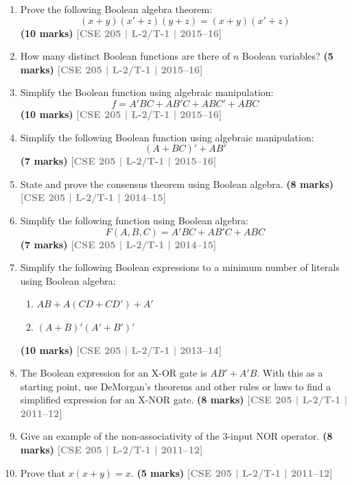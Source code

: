\documentclass[12pt]{article}
\newcommand{\yr}[1]{\hfill\textcolor{gray}{\small\textbf{[#1]}}}
\newcommand{\mk}[1]{\textcolor{orange!70!black}{\small\textbf{(#1 marks)}}}
\begin{document}
\begin{enumerate}
\item Prove the following Boolean algebra theorem:
\[ (x + y)(x' + z)(y + z) = (x + y)(x' + z) \]
\mk{10} \yr{CSE 205 | L-2/T-1 | 2015--16}



\item How many distinct Boolean functions are there of $n$ Boolean variables?
\mk{5} \yr{CSE 205 | L-2/T-1 | 2015--16}



\item Simplify the Boolean function using algebraic manipulation:
\[ f = A'BC + AB'C + ABC' + ABC \]
\mk{10} \yr{CSE 205 | L-2/T-1 | 2015--16}



\item Simplify the following Boolean function using algebraic manipulation:
\[ (A + BC)' + AB' \]
\mk{7} \yr{CSE 205 | L-2/T-1 | 2015--16}



\item State and prove the consensus theorem using Boolean algebra.
\mk{8} \yr{CSE 205 | L-2/T-1 | 2014--15}



\item Simplify the following function using Boolean algebra:
\[ F(A, B, C) = A'BC + AB'C + ABC \]
\mk{7} \yr{CSE 205 | L-2/T-1 | 2014--15}



\item Simplify the following Boolean expressions to a minimum number of literals using Boolean algebra:
\begin{enumerate}
  \item $AB + A(CD + CD') + A'$
  \item $(A + B)'(A' + B')'$
\end{enumerate}
\mk{10} \yr{CSE 205 | L-2/T-1 | 2013--14}



\item The Boolean expression for an X-OR gate is $AB' + A'B$. With this as a starting point, use DeMorgan's theorems and other rules or laws to find a simplified expression for an X-NOR gate.
\mk{8} \yr{CSE 205 | L-2/T-1 | 2011--12}



\item Give an example of the non-associativity of the 3-input NOR operator.
\mk{8} \yr{CSE 205 | L-2/T-1 | 2011--12}



\item Prove that $x(x + y) = x$.
\mk{5} \yr{CSE 205 | L-2/T-1 | 2011--12}



\end{enumerate}
\end{document}
